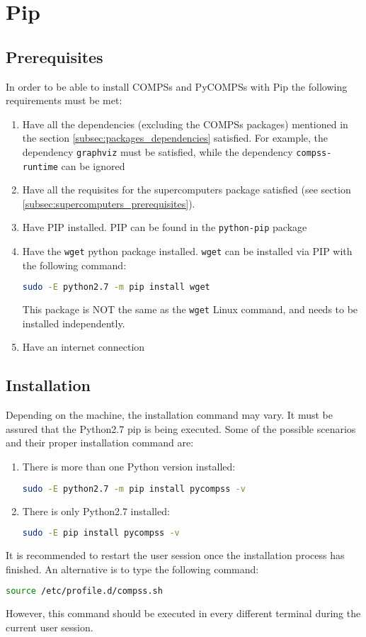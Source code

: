 \section{Pip}
\label{sec:Pip}

\subsection{Prerequisites}
\label{subsec:pip_prerequisites}
In order to be able to install COMPSs and PyCOMPSs with Pip the following requirements must be met:
\begin{enumerate}
 \item Have all the dependencies (excluding the COMPSs packages) mentioned in the section \ref{subsec:packages_dependencies} satisfied. For example, the dependency \verb|graphviz|
 must be satisfied, while the dependency \verb|compss-runtime| can be ignored
 \item Have all the requisites for the supercomputers package satisfied (see section \ref{subsec:supercomputers_prerequisites}).
 \item Have PIP installed. PIP can be found in the \verb|python-pip| package
 \item Have the \verb|wget| python package installed. \verb|wget| can be installed via PIP with the following command:
 \begin{lstlisting}[language=bash]
 sudo -E python2.7 -m pip install wget\end{lstlisting}
 This package is NOT  the same as the \verb|wget| Linux command, and needs to be installed independently.
 \item Have an internet connection
\end{enumerate}
\subsection{Installation}
\label{subsec:pip_installation}
Depending on the machine, the installation command may vary. It must be assured that the Python2.7 pip is being executed. Some of the possible scenarios and their proper installation command are:
\begin{enumerate}
 \item There is more than one Python version installed:
 \begin{lstlisting}[language=bash]
 sudo -E python2.7 -m pip install pycompss -v\end{lstlisting}
 \item There is only Python2.7 installed:
 \begin{lstlisting}[language=bash]
 sudo -E pip install pycompss -v \end{lstlisting}
\end{enumerate}
It is recommended to restart the user session once the installation process has finished. An alternative is to type the following command:
\begin{lstlisting}[language=bash]
source /etc/profile.d/compss.sh\end{lstlisting}
However, this command should be executed in every different terminal during the current user session.

